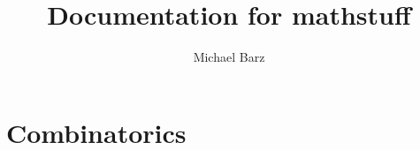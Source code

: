 \documentclass{article}
\title{Documentation for mathstuff}
\author{Michael Barz}
\date{ }
\begin{document}
\tableofcontents
\eject

\section{Combinatorics}


\end{document}
